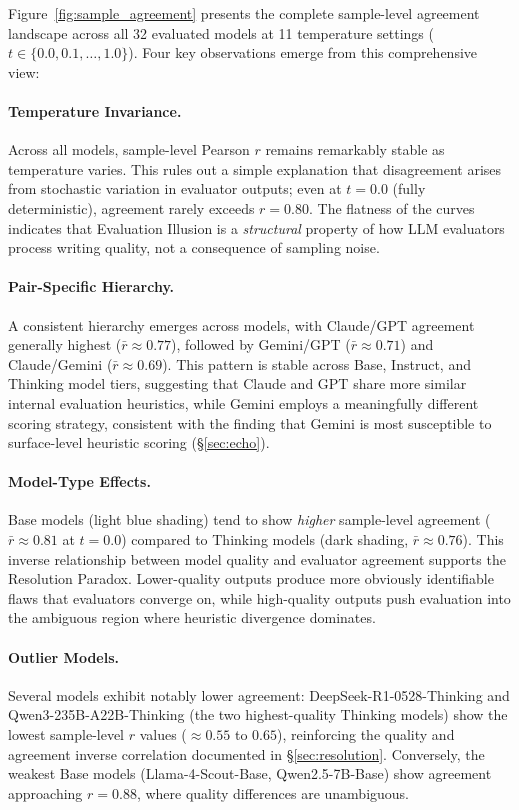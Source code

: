 \documentclass{article}
\begin{document}
Figure~\ref{fig:sample_agreement} presents the complete sample-level agreement landscape across all 32 evaluated models at 11 temperature settings ($t \in \{0.0, 0.1, \ldots, 1.0\}$). Four key observations emerge from this comprehensive view:

\paragraph{Temperature Invariance.} Across all models, sample-level Pearson $r$ remains remarkably stable as temperature varies. This rules out a simple explanation that disagreement arises from stochastic variation in evaluator outputs; even at $t{=}0.0$ (fully deterministic), agreement rarely exceeds $r = 0.80$. The flatness of the curves indicates that Evaluation Illusion is a \textit{structural} property of how LLM evaluators process writing quality, not a consequence of sampling noise.

\paragraph{Pair-Specific Hierarchy.} A consistent hierarchy emerges across models, with Claude/GPT agreement generally highest ($\bar{r} \approx 0.77$), followed by Gemini/GPT ($\bar{r} \approx 0.71$) and Claude/Gemini ($\bar{r} \approx 0.69$). This pattern is stable across Base, Instruct, and Thinking model tiers, suggesting that Claude and GPT share more similar internal evaluation heuristics, while Gemini employs a meaningfully different scoring strategy, consistent with the finding that Gemini is most susceptible to surface-level heuristic scoring (\S\ref{sec:echo}).

\paragraph{Model-Type Effects.} Base models (light blue shading) tend to show \textit{higher} sample-level agreement ($\bar{r} \approx 0.81$ at $t{=}0.0$) compared to Thinking models (dark shading, $\bar{r} \approx 0.76$). This inverse relationship between model quality and evaluator agreement supports the Resolution Paradox. Lower-quality outputs produce more obviously identifiable flaws that evaluators converge on, while high-quality outputs push evaluation into the ambiguous region where heuristic divergence dominates.

\paragraph{Outlier Models.} Several models exhibit notably lower agreement: DeepSeek-R1-0528-Thinking and Qwen3-235B-A22B-Thinking (the two highest-quality Thinking models) show the lowest sample-level $r$ values ($\approx 0.55$ to $0.65$), reinforcing the quality and agreement inverse correlation documented in \S\ref{sec:resolution}. Conversely, the weakest Base models (Llama-4-Scout-Base, Qwen2.5-7B-Base) show agreement approaching $r = 0.88$, where quality differences are unambiguous.
\end{document}
